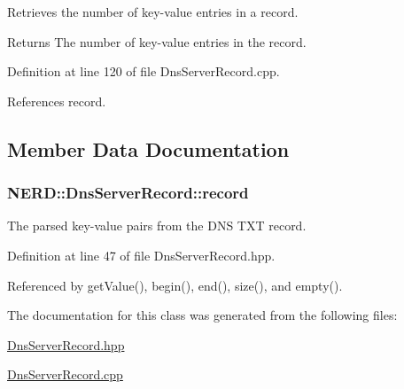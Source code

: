 \-Retrieves the number of key-\/value entries in a record. 

\begin{DoxyReturn}{\-Returns}
\-The number of key-\/value entries in the record. 
\end{DoxyReturn}


\-Definition at line 120 of file \-Dns\-Server\-Record.\-cpp.



\-References record.



\subsection{\-Member \-Data \-Documentation}
\hypertarget{classNERD_1_1DnsServerRecord_ae061df21d0b8072df5a38a88dbcb405e}{
\subsubsection[{record}]{ {\bf \-N\-E\-R\-D\-::\-Dns\-Server\-Record\-::record}}}
\label{classNERD_1_1DnsServerRecord_ae061df21d0b8072df5a38a88dbcb405e}


\-The parsed key-\/value pairs from the \-D\-N\-S \-T\-X\-T record. 



\-Definition at line 47 of file \-Dns\-Server\-Record.\-hpp.



\-Referenced by get\-Value(), begin(), end(), size(), and empty().



\-The documentation for this class was generated from the following files\-:\begin{DoxyCompactItemize}
\item 
\hyperlink{DnsServerRecord_8hpp}{\-Dns\-Server\-Record.\-hpp}\item 
\hyperlink{DnsServerRecord_8cpp}{\-Dns\-Server\-Record.\-cpp}\end{DoxyCompactItemize}

